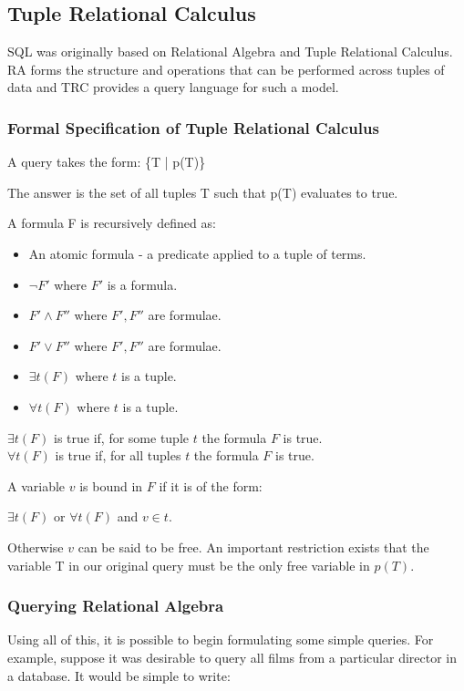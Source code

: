\documentclass[a4wide, 11pt]{article}
\begin{document}
\subsection{Tuple Relational Calculus}

SQL was originally based on Relational Algebra and Tuple Relational Calculus.
RA forms the structure and operations that can be performed
across tuples of data and TRC provides a query language for such a model.

\subsubsection{Formal Specification of Tuple Relational Calculus\cite{lecRA}}

A query takes the form: \{T | p(T)\}

The answer is the set of all tuples T such that p(T) evaluates to
true.

A formula F is recursively defined as:
\begin{itemize}
\item  An atomic formula - a predicate applied to a tuple of terms.
\item  $\lnot F'$ where $F'$ is a formula.
\item  $F' \land F''$ where $F', F''$ are formulae.
\item  $F' \lor F''$ where $F', F''$ are formulae.
\item  $\exists t(F)$ where $t$ is a tuple.
\item  $\forall t(F)$ where $t$ is a tuple.
\end{itemize}

$\exists t(F)$ is true if, for some tuple $t$ the formula $F$ is true.\\
$\forall t(F)$ is true if, for all tuples $t$ the formula $F$ is true.

A variable $v$ is bound in $F$ if it is of the form:

$\exists t(F)$ or $\forall t(F)$ and $v \in t$.

Otherwise $v$ can be said to be free. An important restriction exists that the
variable T in our original query must be the only free variable in $p(T)$.

\subsubsection{Querying Relational Algebra}

Using all of this, it is possible to begin formulating some simple queries. For
example, suppose it was desirable to query all films from a particular director in
a database. It would be simple to write:
\end{document}
